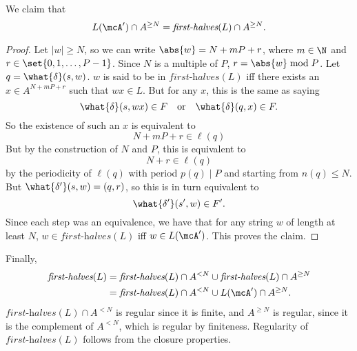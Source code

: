 \documentclass[12pt]{article}
\newcommand\firsthalf{\textit{first-halves}}
\begin{document}
\begin{solution}
    We claim that \[
        L(\mcA') \cap A^{\ge N} = \firsthalf(L) \cap A^{\ge N}.
    \]
    \begin{proof}
        Let $|w| \ge N$, so we can write $\abs{w} = N + mP + r$,
        where $m \in \N$ and $r \in \set{0, 1, \dots, P-1}$.
        Since $N$ is a multiple of $P$, $r = \abs{w} \bmod P$.
        Let $q = \what{\delta}(s, w)$.
        $w$ is said to be in $\firsthalf(L)$ iff there exists an
        $x \in A^{N+mP+r}$ such that $wx \in L$.
        But for any $x$, this is the same as saying \[
            \what{\delta}(s, wx) \in F \quad \text{or} \quad
            \what{\delta}(q, x) \in F.
        \] So the existence of such an $x$ is equivalent to \[
            N + mP + r \in \ell(q)
        \] But by the construction of $N$ and $P$, this is equivalent to \[
            N + r \in \ell(q)
        \] by the periodicity of $\ell(q)$ with period $p(q) \mid P$
        and starting from $n(q) \le N$.
        But $\what{\delta'}(s, w) = (q, r)$, so this is in turn
        equivalent to \[
            \what{\delta'}(s', w) \in F'.
        \]
        Since each step was an equivalence, we have that for any string $w$
        of length at least $N$, $w \in \firsthalf(L)$ iff $w \in L(\mcA')$.
        This proves the claim.
    \end{proof}
    Finally, \begin{align*}
        \firsthalf(L) &= \firsthalf(L) \cap A^{<N} \cup
            \firsthalf(L) \cap A^{\ge N} \\
        &= \firsthalf(L) \cap A^{<N} \cup L(\mcA') \cap A^{\ge N}.
    \end{align*}
    $\firsthalf(L) \cap A^{<N}$ is regular since it is finite,
    and $A^{\ge N}$ is regular, since it is the complement of $A^{<N}$,
    which is regular by finiteness.
    Regularity of $\firsthalf(L)$ follows from the closure properties.
\end{solution}
\end{document}
